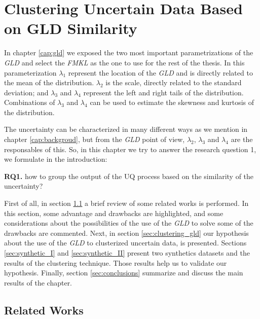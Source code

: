 \chapter[Clustering Uncertain Data Based on GLD Similarity]{Clustering Uncertain Data Based on GLD Similarity}\label{cap:gld_clustering}

In chapter \ref{cap:gld} we exposed the two most important parametrizations of the \textit{GLD} and select the \textit{FMKL} as  the one to use for the rest of the  thesis. In this parameterization $\lambda_{1}$ represent the location of the \textit{GLD} and is directly related to the mean of the distribution. $\lambda_{2}$ is the scale, directly related to the standard deviation; and $\lambda_{3}$ and $\lambda_{4}$ represent the left and right tails of the distribution. Combinations of $\lambda_{3}$ and $\lambda_{4}$ can be used to estimate the skewness and kurtosis of the distribution.

The uncertainty can be characterized in many different ways as we mention in chapter \ref{cap:backgroud}, but from the \textit{GLD} point of view, $\lambda_{2}$, $\lambda_{3}$ and $\lambda_{4}$ are the responsables of this. So, in this chapter we try to answer the research question 1, we formulate in the introduction:

\begin{tcolorbox}
\textbf{RQ1.} how to group the output of the UQ process based on the similarity of the uncertainty?
\end{tcolorbox}


First of all, in section \ref{sec:related_works} a brief review of some related works is performed. In this section, some advantage and drawbacks are highlighted, and some considerations about the possibilities of the use of the \textit{GLD} to solve some of the drawbacks are commented. Next, in section \ref{sec:clustering_gld} our hypothesis about the use of the \textit{GLD} to clusterized uncertain data, is presented. Sections \ref{sec:synthetic_I} and \ref{sec:synthetic_II} present two synthetics datasets and the results of the clustering technique. Those results help us to validate our hypothesis. Finally, section \ref{sec:conclusions} summarize and discuss the main results of the chapter.

\section{Related Works}\label{sec:related_works}

\cite{Jiang2011}

